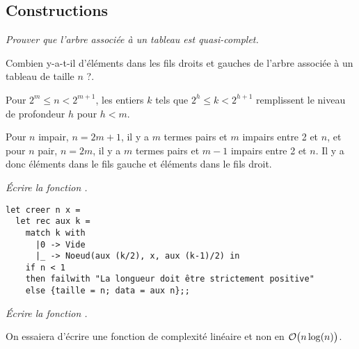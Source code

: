 \subsection{Constructions}
\begin{Exercise}[title = Nombres d'éléments]\it 
Prouver que l'arbre associée à un tableau est quasi-complet.

Combien y-a-t-il d'éléments dans les fils droits et gauches de l'arbre associée à un tableau de taille $n$ ?.
\end{Exercise}
\begin{Answer}
Pour $2^m \le n < 2^{m+1}$, les entiers $k$ tels que $2^h \le k < 2^{h+1}$ remplissent le niveau de profondeur $h$ pour $h< m$. 

Pour $n$ impair, $n = 2m+1$, il y a $m$ termes pairs et $m$ impairs entre 2 et $n$, et pour $n$ pair, $n = 2m$, il y a $m$ termes pairs et $m-1$ impairs entre 2 et $n$. Il y a donc  éléments dans le fils gauche et  éléments dans le fils droit.
\end{Answer}
\begin{Exercise}[title = Création]\it 
Écrire la fonction .
\end{Exercise}
\begin{Answer}
\begin{lstlisting}
let creer n x =
  let rec aux k =
    match k with
      |0 -> Vide
      |_ -> Noeud(aux (k/2), x, aux (k-1)/2) in
    if n < 1
    then failwith "La longueur doit être strictement positive"
    else {taille = n; data = aux n};;
\end{lstlisting}
\newpage
\end{Answer}
\begin{Exercise}[title = Initialisation]\it 
Écrire la fonction .

On essaiera d'écrire une fonction de complexité linéaire et non en ${\cal O}\bigl(n\log(n)\bigr)$.
\end{Exercise}

